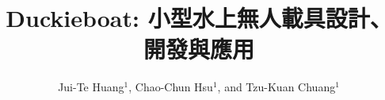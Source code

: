 \documentclass[letterpaper, 10 pt, conference]{ieeeconf}
\title{\LARGE \bf
Duckieboat: 小型水上無人載具設計、開發與應用}
\author{Jui-Te Huang$^{1}$, Chao-Chun Hsu$^{1}$, and Tzu-Kuan Chuang$^{1}$}
\begin{document}
\begin{CJK}{UTF8}{bkai}

    \maketitle

    \thispagestyle{empty}
    \pagestyle{empty}


    

    

    

    

    

    

    

    
    
    





    
    

\end{CJK}
\end{document}
